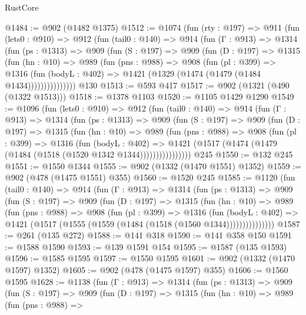 \begin{lexlean}{RustCore}
\begin{coremodule}
@1484 := @902 (@1482 @1375)
@1512 := @1074
    (fun (rty : @197) =>
    @911
      (fun (lets0 : @910) =>
      @912
        (fun (tail0 : @140) =>
        @914
          (fun (Γ : @913) =>
          @1314
            (fun (ps : @1313) =>
            @909
              (fun (S : @197) =>
              @909
                (fun (D : @197) =>
                @1315
                  (fun (hn : @10) =>
                  @989
                    (fun (pns : @988) =>
                    @908
                      (fun (pl : @399) =>
                      @1316
                        (fun (bodyL : @402) =>
                        @1421 (@1329 (@1474 (@1479 (@1484 @1434)))))))))))))))
    @130
@1513 := @593 @417
@1517 := @902 (@1321 (@490 (@1322 @1513)))
@1518 := @1378 @1103
@1520 := @1105 @1429 @1290
@1549 := @1096
    (fun (lets0 : @910) =>
    @912
      (fun (tail0 : @140) =>
      @914
        (fun (Γ : @913) =>
        @1314
          (fun (ps : @1313) =>
          @909
            (fun (S : @197) =>
            @909
              (fun (D : @197) =>
              @1315
                (fun (hn : @10) =>
                @989
                  (fun (pns : @988) =>
                  @908
                    (fun (pl : @399) =>
                    @1316
                      (fun (bodyL : @402) =>
                      @1421 (@1517 (@1474 (@1479 (@1484 (@1518 (@1520 @1342 @1344))))))))))))))))
    @245
@1550 := @132 @245
@1551 := @1550 @1344
@1555 := @902 (@1332 (@1470 @1551) @1352)
@1559 := @902 (@478 (@1475 @1551) @355)
@1560 := @1520 @245
@1585 := @1120
    (fun (tail0 : @140) =>
    @914
      (fun (Γ : @913) =>
      @1314
        (fun (ps : @1313) =>
        @909
          (fun (S : @197) =>
          @909
            (fun (D : @197) =>
            @1315
              (fun (hn : @10) =>
              @989
                (fun (pns : @988) =>
                @908
                  (fun (pl : @399) =>
                  @1316
                    (fun (bodyL : @402) =>
                    @1421 (@1517 (@1555 (@1559 (@1484 (@1518 (@1560 @1344)))))))))))))))
@1587 := @261 (@135 @272)
@1588 := @141 @318
@1590 := @141 @358 @150
@1591 := @1588 @1590
@1593 := @139 @1591 @154
@1595 := @1587 (@135 @1593)
@1596 := @1585 @1595
@1597 := @1550 @1595
@1601 := @902 (@1332 (@1470 @1597) @1352)
@1605 := @902 (@478 (@1475 @1597) @355)
@1606 := @1560 @1595
@1628 := @1138
    (fun (Γ : @913) =>
    @1314
      (fun (ps : @1313) =>
      @909
        (fun (S : @197) =>
        @909
          (fun (D : @197) =>
          @1315
            (fun (hn : @10) =>
            @989
              (fun (pns : @988) =>

\end{coremodule}
\end{lexlean}
